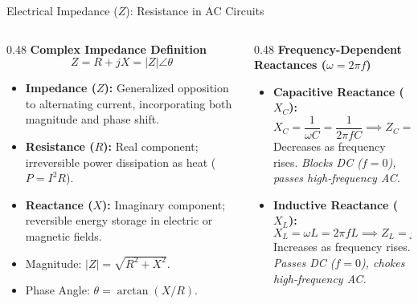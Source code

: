 \begin{frame}{Electrical Impedance ($Z$): Resistance in AC Circuits}
    \begin{columns}[T]
        \begin{column}{0.48\textwidth}
            \textbf{Complex Impedance Definition}
            $$Z = R + jX = |Z|\angle\theta$$
            \begin{itemize}
                \item \textbf{Impedance ($Z$):} Generalized opposition to alternating current, incorporating both magnitude and phase shift.
                \item \textbf{Resistance ($R$):} Real component; irreversible power dissipation as heat ($P = I^2 R$).
                \item \textbf{Reactance ($X$):} Imaginary component; reversible energy storage in electric or magnetic fields.
                \item Magnitude: $|Z| = \sqrt{R^2 + X^2}$.
                \item Phase Angle: $\theta = \arctan(X/R)$.
            \end{itemize}
        \end{column}
        \begin{column}{0.48\textwidth}
            \textbf{Frequency-Dependent Reactances ($\omega = 2\pi f$)}
            \begin{itemize}
                \item \textbf{Capacitive Reactance ($X_C$):}
                $$X_C = \frac{1}{\omega C} = \frac{1}{2\pi f C} \implies Z_C = -j\frac{1}{\omega C}$$
                Decreases as frequency rises. \textit{Blocks DC ($f=0$), passes high-frequency AC.}
                \item \textbf{Inductive Reactance ($X_L$):}
                $$X_L = \omega L = 2\pi f L \implies Z_L = j\omega L$$
                Increases as frequency rises. \textit{Passes DC ($f=0$), chokes high-frequency AC.}
            \end{itemize}
        \end{column}
    \end{columns}
\end{frame}

